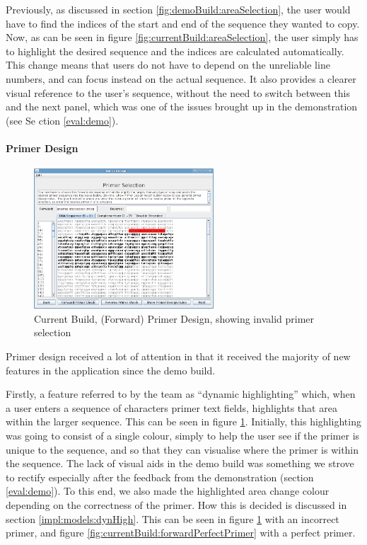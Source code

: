 Previously, as discussed in section \ref{fig:demoBuild:areaSelection},
the user would have to find the indices of the start and end of the
sequence they wanted to copy.
Now, as can be seen in figure \ref{fig:currentBuild:areaSelection},
the user simply has to highlight the desired sequence and the indices
are calculated automatically.
This change means that users do not have to depend on the unreliable
line numbers, and can focus instead on the actual sequence.
It also provides a clearer visual reference to the user's sequence,
without the need to switch between this and the next panel, which was
one of the issues brought up in the demonstration (see Se
ction
\ref{eval:demo}).

\paragraph{Primer Design}

\begin{figure}[h]
  \begin{center}
    \includegraphics[width=0.6\textwidth]{./images/currentBuild/forwardPrimerDesignRed.png}
    \caption{
      \label{fig:currentBuild:forwardPrimerDesignRed}
      Current Build, (Forward) Primer Design, showing invalid primer selection
    }
  \end{center}
\end{figure}

Primer design received a lot of attention in that it received the
majority of new features in the application since the demo build.

Firstly, a feature referred to by the team as ``dynamic highlighting''
which, when a user enters a sequence of characters primer text fields,
highlights that area within the larger sequence. This can be
seen in figure \ref{fig:currentBuild:forwardPrimerDesignRed}.
Initially, this highlighting was going to consist of a single colour, 
simply to help the user see if the primer is unique to the sequence, 
and so that they can visualise where the primer is within the sequence.
The lack of visual aids in the demo build was something we strove to
rectify especially after the feedback from the demonstration (section
\ref{eval:demo}).
To this end, we also made the highlighted area change colour depending 
on the correctness of the primer. How this is decided is discussed in 
section \ref{impl:models:dynHigh}.
This can be seen in figure \ref{fig:currentBuild:forwardPrimerDesignRed} 
with an incorrect primer, and figure \ref{fig:currentBuild:forwardPerfectPrimer} 
with a perfect primer.

